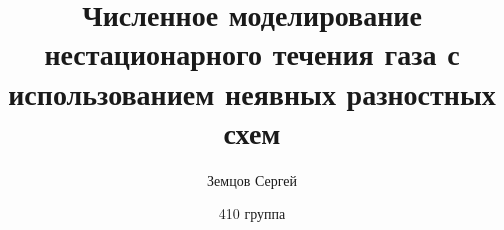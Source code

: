 \documentclass[a4paper, 12pt]{article}
\begin{document}
\title{Численное моделирование нестационарного течения газа с использованием неявных разностных схем}
\author{Земцов Сергей}
\date{410 группа}
\maketitle

\newpage
\tableofcontents
\newpage





\end{document}
